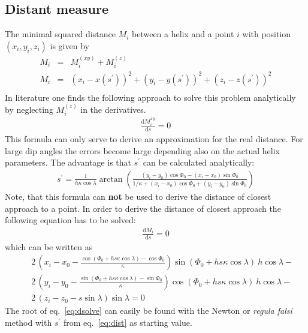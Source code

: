 \documentclass[twoside]{article}
\begin{document}
\begin{description}
\subsection{Distant measure}
The minimal squared distance $M_i$ between a helix and a
point $i$ with position $(x_i, y_i, z_i)$ is given by
\begin{eqnarray}
     M_i & = & M_i^{(xy)} + M_i^{(z)} \\
     M_i & = & (x_i - x(s^\prime))^2 + (y_i - y(s^\prime))^2 + (z_i - z(s^\prime))^2 \\
\end{eqnarray}
In literature one finds the following approach to solve this problem analytically
by neglecting $M_i^{(z)}$ in the derivatives.
\begin{eqnarray}
\frac{\mathrm{d}M_i^{xy}}{\mathrm{d}s}  = 0
\end{eqnarray}
This formula can only serve to derive an approximation for the real distance.
For large dip angles the errors become large depending also on the actual helix
parameters. The advantage is that $s^\prime$ can be calculated analytically:
\begin{eqnarray}
  s^\prime = \frac{1}{h \kappa \cos\lambda} \arctan \left(
    \frac{(y_i-y_0)\cos\Phi_0 - (x_i-x_0) \sin\Phi_0}
    {1/\kappa + (x_i-x_0) \cos\Phi_0 + (y_i-y_0)\sin\Phi_0} \right) \label{eq:dist}
\end{eqnarray}
Note, that this formula can {\bf not} be used to derive the distance of closest
approach to a point.
In order to derive the distance of closest approach the following equation
has to be solved:
\begin{eqnarray}
\frac{\mathrm{d}M_i}{\mathrm{d}s}  = 0
\end{eqnarray}
which can be written as
\begin{eqnarray}
&&2\,\left (x_i-x_0-{\frac {\cos(\Phi_0+h s
  \kappa\cos\lambda)-\cos\Phi_0}{\kappa}}\right) 
  \sin(\Phi_0+h s \kappa\cos\lambda)\ h\cos\lambda -  \nonumber \\
&&2\,\left (y_i-y_0-{\frac {\sin(\Phi_0+h s \kappa\cos\lambda)-\sin
  \Phi_0}{\kappa}}\right) 
  \cos(\Phi_0+ h s \kappa\cos\lambda)\ h\cos\lambda- \nonumber \\
&&2\,\left(z_i-z_0-s\sin\lambda\right )\sin\lambda = 0   \label{eq:dsolve}
\end{eqnarray}
The root of eq.~\ref{eq:dsolve} can easily be found with the Newton or
{\it regula falsi} method
with $s^\prime$ from eq.~\ref{eq:dist} as starting value.

\end{description}
\end{document}

